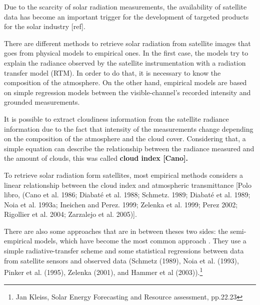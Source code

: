 Due to the scarcity of solar radiation measurements, the availability of satellite data has become an important trigger for the development of targeted products for the solar industry [ref].

There are different methods to retrieve solar radiation from satellite images that goes from physical models to empirical ones. In the first case, the models try to explain the radiance observed by the satellite instrumentation with a radiation transfer model (RTM). In order to do that, it is necessary to know the composition of the atmosphere. On the other hand, empirical models are based on simple regression models between the visible-channel's recorded intensity and grounded measurements. 

It is possible to extract cloudiness information from the satellite radiance information due to the fact that intensity of the measurements change depending on the composition of the atmosphere and the cloud cover. Considering that, a simple equation can describe the relationship between the radiance measured and the amount of clouds, this was called \textbf{cloud index [Cano].}

To retrieve solar radiation form satellites, most empirical methods considers a linear relationship between the cloud index and atmospheric transmittance \cite*{Polo2008} [Polo libro, (Cano et al. 1986; Diabaté et al. 1988; Schmetz. 1989; Diabaté et al. 1989; Noia et al. 1993a; Ineichen and Perez. 1999; Zelenka et al. 1999; Perez 2002; Rigollier et al. 2004; Zarzalejo et al. 2005)].  


There are also some approaches that are in between theses two sides: the semi-empirical models, which have become the most common approach \cite*{Polo2008}. They use a simple radiative-transfer scheme and some statistical regressions between data from satellite sensors and observed data (Schmetz (1989), Noia et al. (1993), Pinker et al. (1995), Zelenka (2001), and Hammer et al (2003)).\footnote{Jan Kleiss, Solar Energy Forecasting and Resource assessment, pp.22.23}



